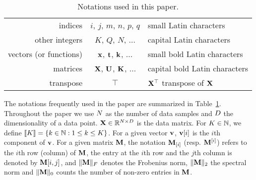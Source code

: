 

\begin{table}[t]
	\centering
	\begin{tabular}{|r|c|l|}
		\hline
		indices &  $i$, $j$, $m$, $n$, $p$, $q$ &  small  Latin characters  \\
		other integers &  $K$, $Q$, $N$, $\ldots$ &  capital  Latin characters \\
		vectors (or functions) & ${\mathbf{x}}$, ${\mathbf{t}}$, ${\mathbf{k}}$, $\ldots$ & small bold Latin characters \\
		matrices  & ${\mathbf{X}}$, ${\mathbf{U}}$, ${\mathbf{K}}$, $\ldots$ & capital bold Latin characters \\
		transpose & $\top$ & ${\mathbf{X}}^\top$ transpose of  ${\mathbf{X}}$ \\
		\hline
	\end{tabular}
	\caption{Notations used in this paper.}
	\label{tab:notation}
\end{table}
\addtocounter{footnote}{0}


The notations frequently used in the paper are summarized in Table~\ref{tab:notation}. 
%
Throughout the paper we use $N$ as the number of data samples and $D$ the dimensionality of a data point. 
${\mathbf{X}} \in \mathbb{R}^{N \times D}$ is the data matrix. 
For $K \in {\mathbb{N}}$, we define $\left \llbracket K\right \rrbracket=\left \lbrace k\in {\mathbb{N}}: 1 \leq k \leq K\right \rbrace$.
%
For a given vector ${\mathbf{v}}$, ${\mathbf{v}}[i]$ is the $i$th component of ${\mathbf{v}}$.
%
For a given matrix ${\mathbf{M}}$, the notation ${\mathbf{M}}_{[i]}$ (resp. ${\mathbf{M}}^{[i]}$) refers to the $i$th row (column) of ${\mathbf{M}}$, the entry at the $i$th row and the $j$th column is denoted by ${\mathbf{M}}[i,j]$, and $\|{\mathbf{M}}\|_F$ denotes the Frobenius norm, $\|{\mathbf{M}}\|_2$ the spectral norm and $\|{\mathbf{M}}\|_0$ counts the number of non-zero entries in ${\mathbf{M}}$. 




